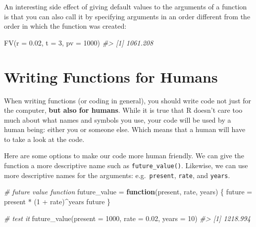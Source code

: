 \documentclass[
]{book}
\newenvironment{Shaded}{\begin{snugshade}}{\end{snugshade}}
\newcommand{\AttributeTok}[1]{\textcolor[rgb]{0.77,0.63,0.00}{#1}}
\newcommand{\CommentTok}[1]{\textcolor[rgb]{0.56,0.35,0.01}{\textit{#1}}}
\newcommand{\ControlFlowTok}[1]{\textcolor[rgb]{0.13,0.29,0.53}{\textbf{#1}}}
\newcommand{\DecValTok}[1]{\textcolor[rgb]{0.00,0.00,0.81}{#1}}
\newcommand{\FloatTok}[1]{\textcolor[rgb]{0.00,0.00,0.81}{#1}}
\newcommand{\FunctionTok}[1]{\textcolor[rgb]{0.00,0.00,0.00}{#1}}
\newcommand{\NormalTok}[1]{#1}
\newcommand{\OtherTok}[1]{\textcolor[rgb]{0.56,0.35,0.01}{#1}}
\newcommand{\SpecialCharTok}[1]{\textcolor[rgb]{0.00,0.00,0.00}{#1}}
\begin{document}
An interesting side effect of giving default values to the arguments of
a function is that you can also call it by specifying arguments in an order
different from the order in which the function was created:

\begin{Shaded}
\begin{Highlighting}[]
\FunctionTok{FV}\NormalTok{(}\AttributeTok{r =} \FloatTok{0.02}\NormalTok{, }\AttributeTok{t =} \DecValTok{3}\NormalTok{, }\AttributeTok{pv =} \DecValTok{1000}\NormalTok{)}
\CommentTok{\#\textgreater{} [1] 1061.208}
\end{Highlighting}
\end{Shaded}

\hypertarget{writing-functions-for-humans}{%
\section{Writing Functions for Humans}\label{writing-functions-for-humans}}

When writing functions (or coding in general), you should write code not just
for the computer, \textbf{but also for humans}. While it is true that R doesn't
care too much about what names and symbols you use, your code will be used by
a human being: either you or someone else. Which means that a human will have
to take a look at the code.

Here are some options to make our code more human friendly. We can give the
function a more descriptive name such as \texttt{future\_value()}. Likewise, we can
use more descriptive names for the arguments: e.g.~\texttt{present}, \texttt{rate}, and
\texttt{years}.

\begin{Shaded}
\begin{Highlighting}[]
\CommentTok{\# future value function}
\NormalTok{future\_value }\OtherTok{=} \ControlFlowTok{function}\NormalTok{(present, rate, years) \{}
\NormalTok{  future }\OtherTok{=}\NormalTok{ present }\SpecialCharTok{*}\NormalTok{ (}\DecValTok{1} \SpecialCharTok{+}\NormalTok{ rate)}\SpecialCharTok{\^{}}\NormalTok{years}
\NormalTok{  future}
\NormalTok{\}}

\CommentTok{\# test it}
\FunctionTok{future\_value}\NormalTok{(}\AttributeTok{present =} \DecValTok{1000}\NormalTok{, }\AttributeTok{rate =} \FloatTok{0.02}\NormalTok{, }\AttributeTok{years =} \DecValTok{10}\NormalTok{)}
\CommentTok{\#\textgreater{} [1] 1218.994}
\end{Highlighting}
\end{Shaded}
\end{document}
